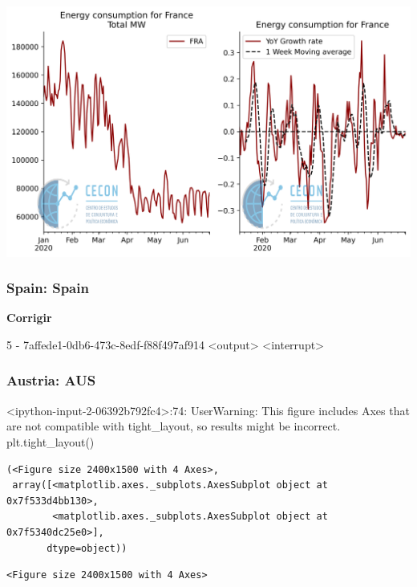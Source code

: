 \documentclass[11pt]{article}
\begin{document}
\begin{center}
\includegraphics[width=.9\linewidth]{obipy-resources/62e383af79e91b63c7fc98dd7fb55b3c3ececcb9/325746abff053090d5f6fe9490ccdb4ba397472d.png}
\end{center}

\subsubsection{Spain: Spain}
\label{sec:orgfcc27e1}

\textbf{Corrigir}

5 - 7affede1-0db6-473c-8edf-f88f497af914 <output> <interrupt>

\subsubsection{Austria: AUS}
\label{sec:org034e0c1}

<ipython-input-2-06392b792fc4>:74: UserWarning: This figure includes Axes that are not compatible with tight\_layout, so results might be incorrect.
  plt.tight\_layout()

\begin{verbatim}
(<Figure size 2400x1500 with 4 Axes>,
 array([<matplotlib.axes._subplots.AxesSubplot object at 0x7f533d4bb130>,
        <matplotlib.axes._subplots.AxesSubplot object at 0x7f5340dc25e0>],
       dtype=object))
\end{verbatim}


\begin{verbatim}
<Figure size 2400x1500 with 4 Axes>
\end{verbatim}
\end{document}
